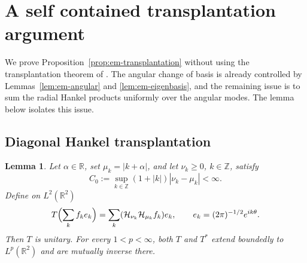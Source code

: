 \documentclass[11pt,a4paper,reqno,backref=page]{amsart}
\newcommand{\R}{\mathbb R}
\newcommand{\Z}{\mathbb Z}
\newcommand{\HH}{\mathcal H}                 %
\newcommand{\coloneq}{:=}
\numberwithin{equation}{section}
\newtheorem{lemma}[theorem]{Lemma}
\theoremstyle{definition}
\theoremstyle{remark}
\begin{document}
\appendix
\section{A self contained transplantation argument}
\label{app:transplantation}

We prove Proposition~\ref{prop:em-transplantation} without
using the transplantation theorem of \cite{FSWZZ2026}.
The angular change of basis is already controlled by
Lemmas~\ref{lem:em-angular} and \ref{lem:em-eigenbasis},
and the remaining issue is to sum the radial Hankel products
uniformly over the angular modes. The lemma below isolates
this issue. 

\subsection{Diagonal Hankel transplantation}

\begin{lemma}\label{lem:diagonal-transplantation}
  Let $\alpha\in\R$, set $\mu_k=|k+\alpha|$, and let
  $\nu_k\ge0$, $k\in\Z$, satisfy
  \begin{equation}\label{eq:app-order-shifts}
    C_0\coloneq\sup_{k\in\Z}
    (1+|k|)|\nu_k-\mu_k|<\infty.
  \end{equation} 
  Define on $L^2(\R^2)$
  \begin{equation}\label{eq:app-diagonal}
    T\Bigl(\sum_k f_ke_k\Bigr)
    =\sum_k(\HH_{\nu_k}\HH_{\mu_k}f_k)e_k,
    \qquad e_k=(2\pi)^{-1/2}e^{ik\theta}.
  \end{equation}
  Then $T$ is unitary. For every $1<p<\infty$, both $T$
  and $T^*$ extend boundedly to $L^p(\R^2)$ and are
  mutually inverse there.
\end{lemma}
\end{document}
